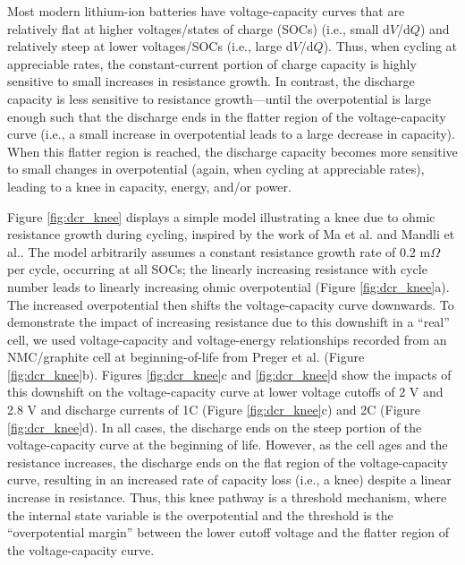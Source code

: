 \documentclass[journal=jpclcd,manuscript=article]{achemso}
\begin{document}
Most modern lithium-ion batteries have voltage-capacity curves that are relatively flat at higher voltages/states of charge (SOCs) (i.e., small d$V$/d$Q$) and relatively steep at lower voltages/SOCs (i.e., large d$V$/d$Q$). Thus, when cycling at appreciable rates, the constant-current portion of charge capacity is highly sensitive to small increases in resistance growth. In contrast, the discharge capacity is less sensitive to resistance growth---until the overpotential is large enough such that the discharge ends in the flatter region of the voltage-capacity curve (i.e., a small increase in overpotential leads to a large decrease in capacity). When this flatter region is reached, the discharge capacity becomes more sensitive to small changes in overpotential (again, when cycling at appreciable rates), leading to a knee in capacity, energy, and/or power.

Figure \ref{fig:dcr_knee} displays a simple model illustrating a knee due to ohmic resistance growth during cycling, inspired by the work of Ma et al.\cite{ma_editors_2019} and Mandli et al.\cite{mandli_analysis_2019}. The model arbitrarily assumes a constant resistance growth rate of 0.2 m$\Omega$ per cycle, occurring at all SOCs; the linearly increasing resistance with cycle number leads to linearly increasing ohmic overpotential (Figure \ref{fig:dcr_knee}a). The increased overpotential then shifts the voltage-capacity curve downwards.
To demonstrate the impact of increasing resistance due to this downshift in a ``real'' cell, we used voltage-capacity and voltage-energy relationships recorded from an NMC/graphite cell at beginning-of-life from Preger et al.\cite{preger_degradation_2020} (Figure \ref{fig:dcr_knee}b). Figures \ref{fig:dcr_knee}c and \ref{fig:dcr_knee}d show the impacts of this downshift on the voltage-capacity curve at lower voltage cutoffs of 2 V and 2.8 V and discharge currents of 1C (Figure \ref{fig:dcr_knee}c) and 2C (Figure \ref{fig:dcr_knee}d). In all cases, the discharge ends on the steep portion of the voltage-capacity curve at the beginning of life. However, as the cell ages and the resistance increases, the discharge ends on the flat region of the voltage-capacity curve, resulting in an increased rate of capacity loss (i.e., a knee) despite a linear increase in resistance. Thus, this knee pathway is a threshold mechanism, where the internal state variable is the overpotential and the threshold is the ``overpotential margin'' between the lower cutoff voltage and the flatter region of the voltage-capacity curve.
\end{document}

